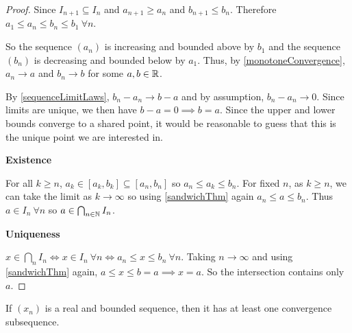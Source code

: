 \documentclass[../main.tex]{subfiles}
\begin{document}
\begin{proof}
  Since $I_{n + 1} \subseteq I_n$ and $a_{n + 1} \geq a_n$ and $b_{n + 1} \leq b_n$.
  Therefore $a_1 \leq a_n \leq b_n \leq b_1\ \forall n$.

  So the sequence $(a_n)$ is increasing and bounded above by $b_1$ and the sequence $(b_n)$ is decreasing and bounded below by $a_1$.
  Thus, by \cref{monotoneConvergence}, $a_n \to a$ and $b_n \to b$ for some $a, b \in \mathbb{R}$.

  By \cref{sequenceLimitLaws}, $b_n - a_n \to b - a$ and by assumption, $b_n - a_n \to 0$.
  Since limits are unique, we then have $b - a = 0 \implies b = a$.
  Since the upper and lower bounds converge to a shared point, it would be reasonable to guess that this is the unique point we are interested in.

  \textbf{Existence}\par
  For all $k \geq n$, $a_k \in [a_k, b_k] \subseteq [a_n, b_n]$ so $a_n \leq a_k \leq b_n$.
  For fixed $n$, as $k \geq n$, we can take the limit as $k \to \infty$ so using \cref{sandwichThm} again $a_n \leq a \leq b_n$.
  Thus $a \in I_n\ \forall n$ so $a \in \bigcap_{n \in \mathbb{N}} I_n$.

  \textbf{Uniqueness}\par
  $x \in \bigcap_{n} I_n \iff x \in I_n\ \forall n \iff a_n \leq x \leq b_n\ \forall n$.
  Taking $n \to \infty$ and using \cref{sandwichThm} again, $a \leq x \leq b = a \implies x = a$.
  So the intersection contains only $a$.
\end{proof}
\begin{theorem}
  If $(x_n)$ is a real and bounded sequence, then it has at least one convergence subsequence.
  \label{BWT}
\end{theorem}
\end{document}
